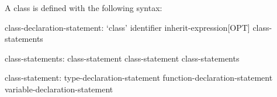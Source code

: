 A class is defined with the following syntax:
\begin{syntax}
class-declaration-statement:
  `class' identifier inherit-expression[OPT] {
    class-statements }

class-statements:
  class-statement
  class-statement class-statements

class-statement:
  type-declaration-statement
  function-declaration-statement
  variable-declaration-statement
\end{syntax}
